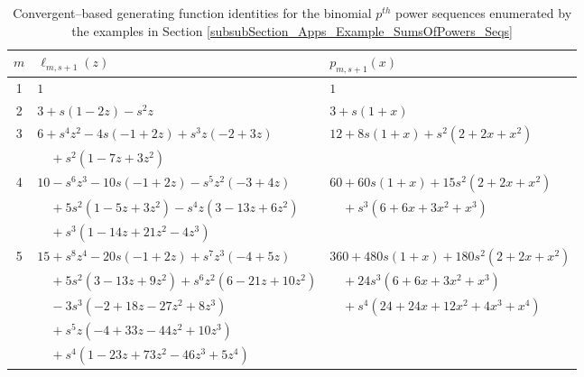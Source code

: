 \documentclass[12pt,reqno]{article}
\numberwithin{sfootnote}{section}
\newcommand{\subtableskip}{\bigskip}
\newcommand{\tabletopstrut}[0]{\rule{0pt}{3ex}}
\numberwithin{equation}{section}
\theoremstyle{DefaultTheoremStyle}
\theoremstyle{definition}
\begin{document}
\begin{table}[h]
\begin{subtable}{\textwidth}
\subtableskip 

\begin{tabular}{|c|l|l|} \hline 
\hline\tabletopstrut 
$m$ & $\ell_{m,s+1}(z)$ & $p_{m,s+1}(x)$ \\ \hline 
1 & $1$ & $1$ \\ 
2 & $3+s (1-2 z)-s^2 z$ & $3+s (1+x)$ \\ 
3 & $6+s^4 z^2-4 s (-1+2 z)+s^3 z (-2+3 z)$ & 
    $12+8 s (1+x)+s^2 (2+2 x+x^2)$ \\ 
  & $\quad + 
     s^2 (1-7 z+3 z^2)$ & \\ 
4 & $10-s^6 z^3-10 s (-1+2 z)-s^5 z^2 (-3+4 z)$ & 
    $60+60 s (1+x)+15 s^2 (2+2 x+x^2)$ \\ 
  & $\quad + 
     5 s^2 (1-5 z+3 z^2) - 
     s^4 z (3-13 z+6 z^2)$ & 
    $\quad + 
     s^3 (6+6 x+3 x^2+x^3)$ \\ 
  & $\quad  + 
     s^3 (1-14 z+21 z^2-4 z^3)$ & \\ 
5 & $15+s^8 z^4-20 s (-1+2 z)+s^7 z^3 (-4+5 z)$ & 
    $360+480 s (1+x) + 180 s^2 (2+2 x+x^2)$ \\ 
  & $\quad + 
     5 s^2 (3-13 z+9 z^2)+s^6 z^2 (6-21 z+10 z^2)$ & 
    $\quad + 
     24 s^3 (6+6 x+3 x^2+x^3)$ \\ 
  & $\quad - 
     3 s^3 (-2+18 z-27 z^2+8 z^3)$ & 
    $\quad + 
     s^4 (24+24 x+12 x^2+4 x^3+x^4)$ \\ 
  & $\quad + 
     s^5 z (-4+33 z-44 z^2+10 z^3)$ & \\ 
  & $\quad + 
     s^4 (1-23 z+73 z^2-46 z^3+5 z^4)$ & \\ \hline 
\hline 
\end{tabular} 

\end{subtable} 

\caption{Convergent--based generating function identities for the 
         binomial $p^{th}$ power sequences 
         enumerated by the examples in 
         Section \ref{subsubSection_Apps_Example_SumsOfPowers_Seqs}} 
\label{table_ConvGF_Examples_for_PthPowerSeqs} 

\end{table} 

\addtocounter{table}{1}
\setcounter{subtable}{0} 
\end{document}
